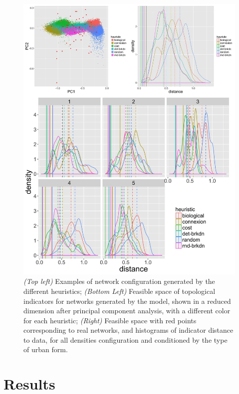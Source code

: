 \documentclass[letterpaper]{article}
\begin{document}
\begin{figure}[h!]
\begin{minipage}[c]{0.45\linewidth}
\end{minipage}
\begin{minipage}[c]{0.55\linewidth}
\includegraphics[width=\linewidth]{figures/7-1-2-fig-networkgrowth-realdistance.jpg}
\end{minipage}
\caption{\textit{(Top left)} Examples of network configuration generated by the different heuristics; \textit{(Bottom Left)} Feasible space of topological indicators for networks generated by the model, shown in a reduced dimension after principal component analysis, with a different color for each heuristic; \textit{(Right)} Feasible space with red points corresponding to real networks, and histograms of indicator distance to data, for all densities configuration and conditioned by the type of urban form.}
\label{fig:fig1}
\end{figure}

\section{Results}
\end{document}
